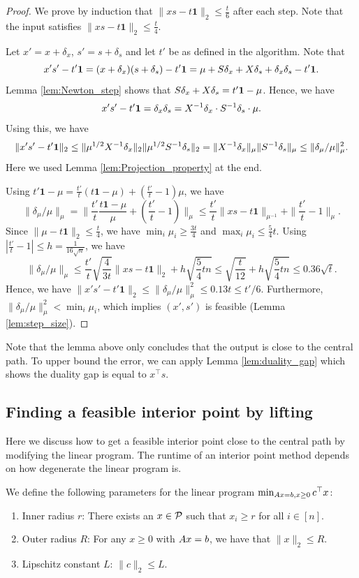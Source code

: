 \begin{proof}
We prove by induction that $\|xs-t\mathbf{1}\|_{2}\leq\frac{t}{6}$
after each step. Note that the input satisfies $\|xs-t\mathbf{1}\|_{2}\leq\frac{t}{4}$.

Let $x'=x+\delta_{x}$, $s'=s+\delta_{s}$ and let $t'$ be as defined
in the algorithm. Note that
\[
x's'-t'\mathbf{1}=(x+\delta_{x})(s+\delta_{s})-t'\mathbf{1}=\mu+S\delta_{x}+X\delta_{s}+\delta_{x}\delta_{s}-t'\mathbf{1}.
\]
Lemma \ref{lem:Newton_step} shows that $S\delta_{x}+X\delta_{s}=t'\mathbf{1}-\mu$.
Hence, we have 
\[
x's'-t'\mathbf{1}=\delta_{x}\delta_{s}=X^{-1}\delta_{x}\cdot S^{-1}\delta_{s}\cdot\mu.
\]
Using this, we have
\[
\|x's'-t'\mathbf{1}\|_{2}\leq\|\mu^{1/2}X^{-1}\delta_{x}\|_{2}\|\mu^{1/2}S^{-1}\delta_{s}\|_{2}=\|X^{-1}\delta_{x}\|_{\mu}\|S^{-1}\delta_{s}\|_{\mu}\leq\|\delta_{\mu}/\mu\|^{2}_{\mu}.
\]
Here we used Lemma \ref{lem:Projection_property} at the end.

Using $t'\mathbf{1}-\mu=\frac{t'}{t}(t\mathbf{1}-\mu)+(\frac{t'}{t}-1)\mu$,
we have
\[
\|\delta_{\mu}/\mu\|_{\mu}=\|\frac{t'}{t}\frac{t\mathbf{1}-\mu}{\mu}+(\frac{t'}{t}-1)\|_{\mu}\leq\frac{t'}{t}\|xs-t\mathbf{1}\|_{\mu^{-1}}+\|\frac{t'}{t}-1\|_{\mu}.
\]
Since $\|\mu-t\mathbf{1}\|_{2}\leq\frac{t}{4}$, we have $\min_{i}\mu_{i}\geq\frac{3t}{4}$
and $\max_{i}\mu_{i}\leq\frac{5}{4}t$. Using $|\frac{t'}{t}-1|\leq h=\frac{1}{16\sqrt{n}}$,
we have
\[
\|\delta_{\mu}/\mu\|_{\mu}\leq\frac{t'}{t}\sqrt{\frac{4}{3t}}\|xs-t\mathbf{1}\|_{2}+h\sqrt{\frac{5}{4}tn}\leq\sqrt{\frac{t}{12}}+h\sqrt{\frac{5}{4}tn}\leq0.36\sqrt{t}.
\]
Hence, we have $\|x's'-t'\mathbf{1}\|_{2}\leq\|\delta_{\mu}/\mu\|^{2}_{\mu}\leq0.13t\leq t'/6$.
Furthermore, $\|\delta_{\mu}/\mu\|^{2}_{\mu}<\min_{i}\mu_{i}$, which
implies $(x',s')$ is feasible (Lemma \ref{lem:step_size}).
\end{proof}
Note that the lemma above only concludes that the output is close
to the central path. To upper bound the error, we can apply Lemma
\ref{lem:duality_gap} which shows the duality gap is equal to $x^{\top}s$.

\subsection{Finding a feasible interior point by lifting\label{subsec:find_IPM_interior}}

Here we discuss how to get a feasible interior point close to the
central path by modifying the linear program. The runtime of an interior
point method depends on how degenerate the linear program is.
\begin{defn}
\label{def:LP_para}We define the following parameters for the linear
program $\min_{A x=b,x\geq0}c^{\top}x$:
\begin{enumerate}
\item Inner radius $r$: There exists an $x\in\mathcal{P}$ such that $x_{i}\geq r$
for all $i\in[n]$.
\item Outer radius $R$: For any $x\geq0$ with $A x=b$, we have that
$\|x\|_{2}\leq R$.
\item Lipschitz constant $L$: $\|c\|_{2}\leq L$.
\end{enumerate}
\end{defn}

